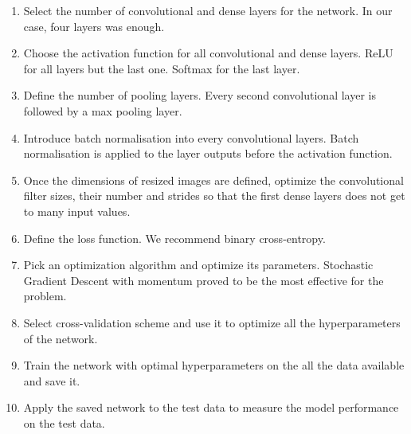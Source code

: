 \documentclass[a4paper]{article}
\begin{document}
    \begin{enumerate}
        \item Select the number of convolutional and dense layers for the network.
        In our case, four layers was enough.
        \item Choose the activation function for all convolutional and dense layers.
        ReLU for all layers but the last one. Softmax for the last layer.
        \item Define the number of pooling layers. Every second convolutional layer
        is followed by a max pooling layer.
        \item Introduce batch normalisation into every convolutional layers.
        Batch normalisation is applied to the layer outputs before the activation function.
        \item Once the dimensions of resized images are defined, optimize the convolutional
        filter sizes, their number and strides so that the first dense layers does not get
        to many input values.
        \item Define the loss function. We recommend binary cross-entropy.
        \item Pick an optimization algorithm and optimize its parameters. Stochastic Gradient
        Descent with momentum proved to be the most effective for the problem.
        \item Select cross-validation scheme and use it to optimize all the hyperparameters
        of the network.
        \item Train the network with optimal hyperparameters on the all the data available and
        save it.
        \item Apply the saved network to the test data to measure the model performance on the
        test data.
    \end{enumerate}
    
\end{document}
